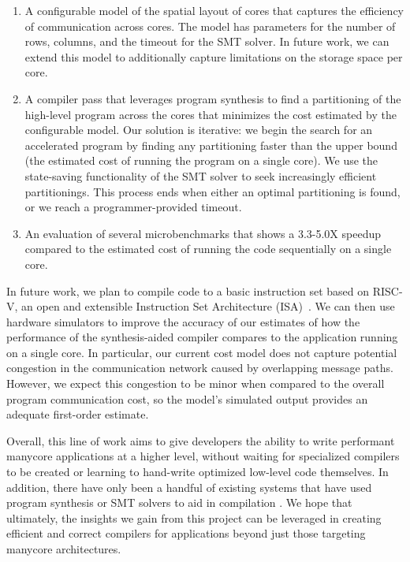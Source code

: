 \documentclass{sig-alternate-05-2015}
\begin{document}
\begin{enumerate}
    \item A configurable model of the spatial layout of cores that captures the efficiency of communication across cores. The model has parameters for the number of rows, columns, and the timeout for the SMT solver. In future work, we can extend this model to additionally capture limitations on the storage space per core. 
    \item A compiler pass that leverages program synthesis to find a partitioning of the high-level program across the cores that minimizes the cost estimated by the configurable model. Our solution is iterative: we begin the search for an accelerated program by finding any partitioning faster than the upper bound (the estimated cost of running the program on a single core). We use the state-saving functionality of the SMT solver to seek increasingly efficient partitionings. This process ends when either an optimal partitioning is found, or we reach a programmer-provided timeout. 
    \item An evaluation of several microbenchmarks that shows a 3.3-5.0X speedup compared to the estimated cost of running the code sequentially on a single core.
\end{enumerate}

In future work, we plan to compile code to a basic instruction set based on RISC-V, an open and extensible Instruction Set Architecture (ISA)~\cite{risc-v}. We can then use hardware simulators to improve the accuracy of our estimates of how the performance of the synthesis-aided compiler compares to the application running on a single core. In particular, our current cost model does not capture potential congestion in the communication network caused by overlapping message paths. However, we expect this congestion to be minor when compared to the overall program communication cost, so the model's simulated output provides an adequate first-order estimate. 

Overall, this line of work aims to give developers the ability to write performant manycore applications at a higher level, without waiting for specialized compilers to be created or learning to hand-write optimized low-level code themselves. In addition, there have only been a handful of existing systems that have used program synthesis or SMT solvers to aid in compilation \cite{chlorophyll, alive, optgen, souper, future}. We hope that ultimately, the insights we gain from this project can be leveraged in creating efficient and correct compilers for applications beyond just those targeting manycore architectures. 
\end{document}
